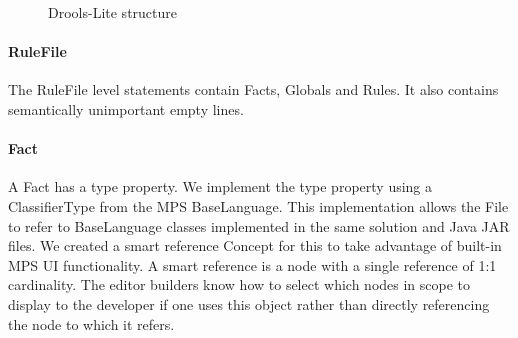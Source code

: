 \begin{figure}[htbp]
    \centering
    \caption{Drools-Lite structure}
    \label{fig:DroolsLiteDiagram}
\end{figure}
 
\paragraph{RuleFile} The RuleFile level statements contain Facts, Globals and Rules.
It also contains semantically unimportant empty lines.

\paragraph{Fact} A Fact has a type property.
We implement the type property using a ClassifierType from the MPS BaseLanguage.
This implementation allows the File to refer to BaseLanguage classes implemented in the same solution and Java JAR files.
We created a smart reference Concept for this to take advantage of built-in MPS UI functionality.
A smart reference is a node with a single reference of 1:1 cardinality.
The editor builders know how to select which nodes in scope to display to the developer if one uses this object rather than directly referencing the node to which it refers.

